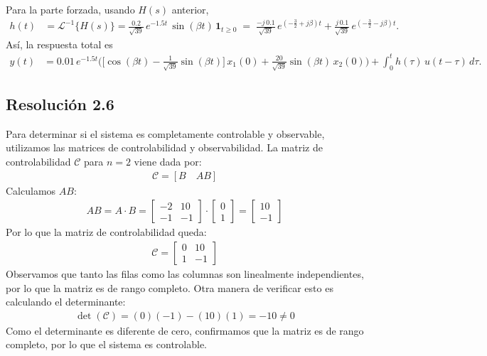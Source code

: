 \documentclass[
  11pt,
  letterpaper,
   addpoints,
  answers
  ]{exam}
\begin{document}
\begin{solution}
Para la parte forzada, usando $H(s)$ anterior,
\begin{align}
h(t)
&=\mathcal{L}^{-1}\!\{H(s)\}
=\frac{0.2}{\sqrt{39}}\,e^{-1.5t}\,\sin(\beta t)\,\mathbf{1}_{t\ge 0}
\;=\;\frac{-j\,0.1}{\sqrt{39}}\,e^{(-\frac{3}{2}+j\beta)t}
+\frac{j\,0.1}{\sqrt{39}}\,e^{(-\frac{3}{2}-j\beta)t}.
\end{align}
Así, la respuesta total es
\begin{align}
y(t)
&=0.01\,e^{-1.5t}
\Bigg(
\Big[\cos(\beta t)-\frac{1}{\sqrt{39}}\sin(\beta t)\Big]\,x_1(0)
+\frac{20}{\sqrt{39}}\sin(\beta t)\,x_2(0)
\Bigg)
+\int_{0}^{t} h(\tau)\,u(t-\tau)\,d\tau .
\end{align}

\subsection*{Resolución 2.6}
Para determinar si el sistema es completamente controlable y observable, utilizamos las matrices de controlabilidad y observabilidad. La matriz de controlabilidad $\mathcal{C}$ para $n=2$ viene dada por:
\begin{align}
\mathcal{C} = [B \quad AB]
\end{align}
Calculamos $AB$:
\begin{align}
AB = A \cdot B = \begin{bmatrix} -2 & 10
\\ -1 & -1 \end{bmatrix} \cdot \begin{bmatrix} 0 \\ 1 \end{bmatrix} = \begin{bmatrix} 10 \\ -1 \end{bmatrix}
\end{align}
Por lo que la matriz de controlabilidad queda:
\begin{align}
\mathcal{C} = \begin{bmatrix} 0 & 10 \\ 1 & -1 \end{bmatrix}
\end{align}
Observamos que tanto las filas como las columnas son linealmente independientes, por lo que la matriz es de rango completo. Otra manera de verificar esto es calculando el determinante:
\begin{align}
\det(\mathcal{C}) = (0)(-1) - (10)(1) = -10 \neq 0
\end{align}
Como el determinante es diferente de cero, confirmamos que la matriz es de rango completo, por lo que el sistema es controlable. 


\end{solution}
\end{document}
